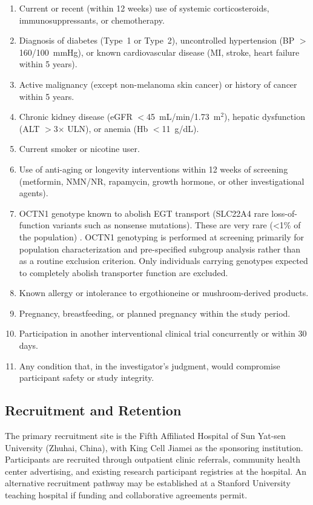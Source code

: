 \documentclass[11pt,a4paper]{article}
\begin{document}
\begin{enumerate}[nosep]
  \item Current or recent (within 12 weeks) use of systemic corticosteroids, immunosuppressants, or chemotherapy.
  \item Diagnosis of diabetes (Type~1 or Type~2), uncontrolled hypertension (BP $>$160/100~mmHg), or known cardiovascular disease (MI, stroke, heart failure within 5 years).
  \item Active malignancy (except non-melanoma skin cancer) or history of cancer within 5 years.
  \item Chronic kidney disease (eGFR $<$45~mL/min/1.73~m$^2$), hepatic dysfunction (ALT $>$3$\times$ ULN), or anemia (Hb $<$11~g/dL).
  \item Current smoker or nicotine user.
  \item Use of anti-aging or longevity interventions within 12 weeks of screening (metformin, NMN/NR, rapamycin, growth hormone, or other investigational agents).
  \item OCTN1 genotype known to abolish EGT transport (SLC22A4 rare loss-of-function variants such as nonsense mutations). These are very rare (<1\% of the population) \cite{urban2007}. OCTN1 genotyping is performed at screening primarily for population characterization and pre-specified subgroup analysis rather than as a routine exclusion criterion. Only individuals carrying genotypes expected to completely abolish transporter function are excluded.
  \item Known allergy or intolerance to ergothioneine or mushroom-derived products.
  \item Pregnancy, breastfeeding, or planned pregnancy within the study period.
  \item Participation in another interventional clinical trial concurrently or within 30 days.
  \item Any condition that, in the investigator's judgment, would compromise participant safety or study integrity.
\end{enumerate}

\subsection{Recruitment and Retention}

The primary recruitment site is the Fifth Affiliated Hospital of Sun Yat-sen University (Zhuhai, China), with King Cell Jiamei as the sponsoring institution. Participants are recruited through outpatient clinic referrals, community health center advertising, and existing research participant registries at the hospital. An alternative recruitment pathway may be established at a Stanford University teaching hospital if funding and collaborative agreements permit.
\end{document}
